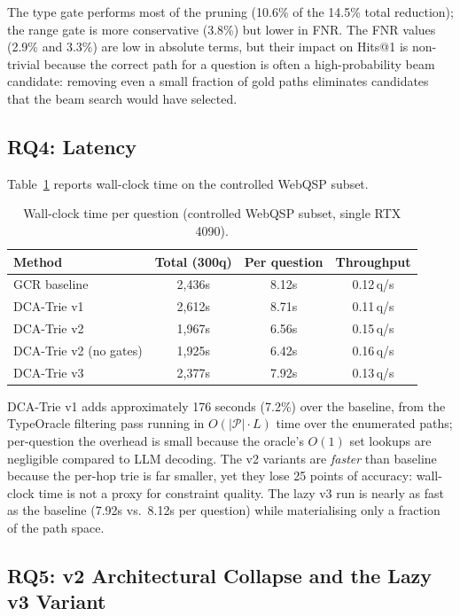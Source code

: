 The type gate performs most of the pruning (10.6\% of the 14.5\% total reduction);
the range gate is more conservative (3.8\%) but lower in FNR. The FNR values (2.9\%
and 3.3\%) are low in absolute terms, but their impact on Hits@1 is non-trivial
because the correct path for a question is often a high-probability beam candidate:
removing even a small fraction of gold paths eliminates candidates that the beam
search would have selected.

\subsection{RQ4: Latency}
\label{sec:rq4}

Table~\ref{tab:rq4} reports wall-clock time on the controlled WebQSP subset.

\begin{table}[htpb]
  \centering
  \caption{Wall-clock time per question (controlled WebQSP subset, single RTX 4090).}
  \label{tab:rq4}
  \begin{tabular}{@{}lccc@{}}
    \toprule
    Method        & Total (300q) & Per question & Throughput \\
    \midrule
    GCR baseline  & 2,436s & 8.12s & 0.12\,q/s \\
    DCA-Trie v1   & 2,612s & 8.71s & 0.11\,q/s \\
    DCA-Trie v2   & 1,967s & 6.56s & 0.15\,q/s \\
    DCA-Trie v2 (no gates) & 1,925s & 6.42s & 0.16\,q/s \\
    DCA-Trie v3   & 2,377s & 7.92s & 0.13\,q/s \\
    \bottomrule
  \end{tabular}
\end{table}

DCA-Trie v1 adds approximately 176 seconds (7.2\%) over the baseline, from the
TypeOracle filtering pass running in $O(|\mathcal{P}| \cdot L)$ time over the enumerated
paths; per-question the overhead is small because the oracle's $O(1)$ set lookups are
negligible compared to LLM decoding. The v2 variants are \emph{faster} than baseline
because the per-hop trie is far smaller, yet they lose 25 points of accuracy: wall-clock
time is not a proxy for constraint quality. The lazy v3 run is nearly as fast as the
baseline (7.92s vs.\ 8.12s per question) while materialising only a fraction of the path
space.

\subsection{RQ5: v2 Architectural Collapse and the Lazy v3 Variant}
\label{sec:rq5}

